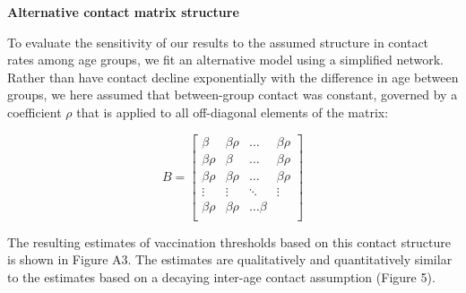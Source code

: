 \textbf{Alternative contact matrix structure}

To evaluate the sensitivity of our results to the assumed structure in contact rates among age groups, we fit an alternative model using a simplified network. Rather than have contact decline exponentially with the difference in age between groups, we here assumed that between-group contact was constant, governed by a coefficient $\rho$ that is applied to all off-diagonal elements of the matrix:

\begin{equation}
B = \left[{
\begin{array}{ccccc}
  {\beta} & {\beta \rho} & \ldots &  {\beta \rho}  \\
  {\beta \rho} & {\beta} & \ldots &  {\beta \rho} \\
{\beta \rho} & {\beta \rho} & \ldots & {\beta \rho}  \\
  \vdots & \vdots & \ddots  & \vdots \\
  {\beta \rho} & {\beta \rho} & \ldots {\beta}  \\
\end{array}
}\right]
\end{equation}

The resulting estimates of vaccination thresholds based on this contact structure is shown in Figure A3. The estimates are qualitatively and quantitatively similar to the estimates based on a decaying inter-age contact assumption (Figure 5).